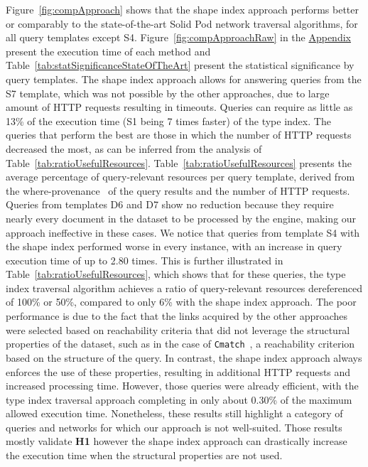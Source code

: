Figure~\ref{fig:compApproach} shows that the shape index approach performs better or comparably to the state-of-the-art Solid Pod network traversal algorithms, for all query templates except S4.
Figure~\ref{fig:compApproachRaw} in the \hyperref[sec:appendix]{Appendix} present the execution time of each method and Table~\ref{tab:statSignificanceStateOfTheArt} present the statistical significance by query templates.
The shape index approach allows for answering queries from the S7 template, which was not possible by the other approaches, due to large amount of HTTP requests resulting in timeouts.
Queries can require as little as 13\% of the execution time (S1 being 7 times faster) of the type index.
The queries that perform the best are those in which the number of HTTP requests decreased the most, as can be inferred from the analysis of Table~\ref{tab:ratioUsefulResources}.
Table~\ref{tab:ratioUsefulResources} presents the average percentage of query-relevant resources per query template, derived from the where-provenance~\cite{buneman2001and} of the query results and the number of HTTP requests. 
Queries from templates D6 and D7 show no reduction because they require nearly every document in the dataset to be processed by the engine, making our approach ineffective in these cases.
We notice that queries from template S4 with the shape index performed worse in every instance, with an increase in query execution time of up to 2.80 times.
This is further illustrated in Table~\ref{tab:ratioUsefulResources}, which shows that for these queries, the type index traversal algorithm achieves a ratio of query-relevant resources dereferenced of 100\% or 50\%, compared to only 6\% with the shape index approach.
The poor performance is due to the fact that the links acquired by the other approaches were selected based on reachability criteria that did not leverage the structural properties of the dataset, such as in the case of \texttt{Cmatch}~\cite{hartig2016walking}, a reachability criterion based on the structure of the query.
In contrast, the shape index approach always enforces the use of these properties, resulting in additional HTTP requests and increased processing time.
However, those queries were already efficient, with the type index traversal approach completing in only about 0.30\% of the maximum allowed execution time.
Nonetheless, these results still highlight a category of queries and networks for which our approach is not well-suited.
Those results mostly validate \textbf{H1} however the shape index approach can drastically increase the execution time when the structural properties are not used.

